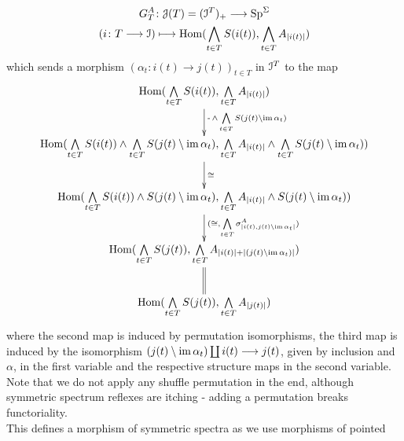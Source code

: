 \begin{defn}
      \begin{gather*}
        G^A_T \colon \cJ(T) = (\cI^T)_+ \to \SpS \\
        (i \colon T \to \cI) \mapsto %
          \Hom(\bigwedge_{t \in T} S(i(t)), \bigwedge_{t \in T} A_{\abs{i(t)}} )
      \end{gather*}
      which sends a morphism $(\alpha_t \colon i(t) \to j(t))_{t \in T}$ in $\mathcal{I}^T$ to the map
      \begin{displaymath}
        \xymatrix{
          \Hom(\bigwedge\limits_{t \in T} S(i(t)), \bigwedge\limits_{t \in T} A_{\abs{i(t)}})
            \ar[d]^-{ \operatorname{-} \wedge \bigwedge\limits_{t \in T} S(j(t) \setminus \im \alpha_t) } \\
          \Hom(\bigwedge\limits_{t \in T} S(i(t)) \wedge %
            \bigwedge\limits_{t \in T} S(j(t) \setminus \im \alpha_t), %
            \bigwedge\limits_{t \in T} A_{\abs{i(t)}} \wedge %
            \bigwedge\limits_{t \in T} S(j(t) \setminus \im \alpha_t))
            \ar[d]^-{\cong} \\
          \Hom(\bigwedge\limits_{t \in T} S(i(t)) \wedge S(j(t) \setminus \im \alpha_t), %
            \bigwedge\limits_{t \in T} A_{\abs{i(t)}} \wedge S(j(t) \setminus \im \alpha_t)) 
            \ar[d]^-{(\cong, \bigwedge\limits_{t \in T} \sigma^A_{\abs{i(t),j(t)\setminus\im\alpha_t}})} \\
          \Hom(\bigwedge\limits_{t \in T} S(j(t)), \bigwedge\limits_{t \in T} A_{\abs{i(t)} + \abs{(j(t)\setminus \im \alpha_t)}})
            \ar@{=}[d] \\
          \Hom(\bigwedge\limits_{t \in T} S(j(t)), \bigwedge\limits_{t \in T} A_{\abs{j(t)}})
        }
      \end{displaymath}
      where the second map is induced by permutation isomorphisms, the third map
      is induced by the isomorphism $(j(t) \setminus \operatorname{im} \alpha_t) \coprod i(t)
      \longrightarrow j(t)$, given by inclusion and $\alpha$, in the first variable and the
      respective structure maps in the second variable. Note that we do not
      apply any shuffle permutation in the end, although symmetric spectrum
      reflexes are itching - adding a permutation breaks functoriality.\\ This
      defines a morphism of symmetric spectra as we use morphisms of pointed

\end{defn}
